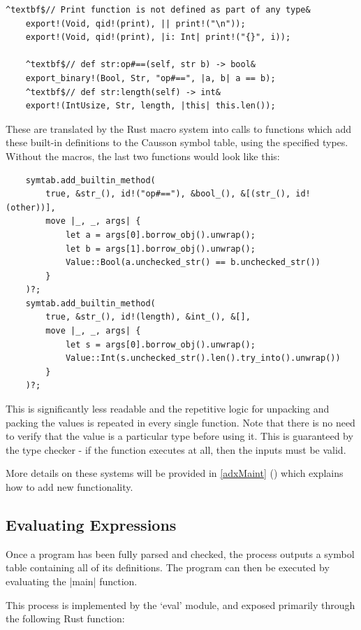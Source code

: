 \documentclass[11pt]{report}
\begin{document}
\begin{Verbatim}[commandchars=^$&]
	^textbf$// Print function is not defined as part of any type&
	export!(Void, qid!(print), || print!("\n"));
	export!(Void, qid!(print), |i: Int| print!("{}", i));

	^textbf$// def str:op#==(self, str b) -> bool&
	export_binary!(Bool, Str, "op#==", |a, b| a == b);
	^textbf$// def str:length(self) -> int&
	export!(IntUsize, Str, length, |this| this.len());
\end{Verbatim}

These are translated by the Rust macro system into calls to functions which add these built-in definitions to the Causson symbol table, using the specified types. Without the macros, the last two functions would look like this:

\begin{Verbatim}
    symtab.add_builtin_method(
        true, &str_(), id!("op#=="), &bool_(), &[(str_(), id!(other))],
        move |_, _, args| {
            let a = args[0].borrow_obj().unwrap();
            let b = args[1].borrow_obj().unwrap();
            Value::Bool(a.unchecked_str() == b.unchecked_str())
        }
    )?;
    symtab.add_builtin_method(
        true, &str_(), id!(length), &int_(), &[],
        move |_, _, args| {
            let s = args[0].borrow_obj().unwrap();
            Value::Int(s.unchecked_str().len().try_into().unwrap())
        }
    )?;
\end{Verbatim}

This is significantly less readable and the repetitive logic for unpacking and packing the values is repeated in every single function. Note that there is no need to verify that the value is a particular type before using it. This is guaranteed by the type checker - if the function executes at all, then the inputs must be valid.

More details on these systems will be provided in \cref{adxMaint} (\emph{}) which explains how to add new functionality.

\subsection{Evaluating Expressions}

Once a program has been fully parsed and checked, the process outputs a symbol table containing all of its definitions. The program can then be executed by evaluating the |main| function.

This process is implemented by the `eval' module, and exposed primarily through the following Rust function:
\end{document}

